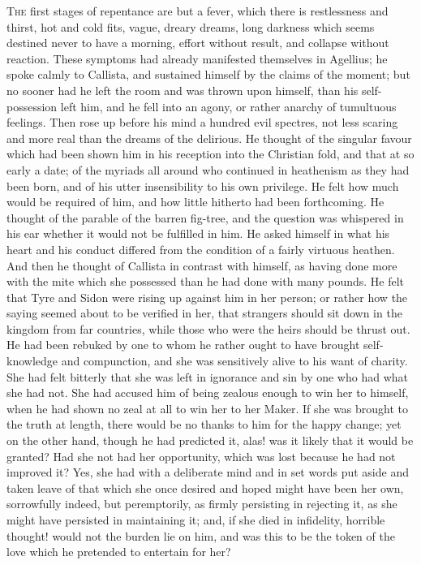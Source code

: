 T\textsc{he} first stages of repentance are but a fever, which there
is restlessness and thirst, hot and cold fits, vague, dreary dreams,
long darkness which seems destined never to have a morning, effort
without result, and collapse without reaction. These symptoms had
already manifested themselves in Agellius; he spoke calmly to Callista,
and sustained himself by the claims of the moment; but no sooner had
he left the room and was thrown upon himself, than his self-possession
left him, and he fell into an agony, or rather anarchy of tumultuous
feelings. Then rose up before his mind a hundred evil spectres, not
less scaring and more real than the dreams of the delirious. He
thought of the singular favour which had been shown him in his
reception into the Christian fold, and that at so early a date; of the
myriads all around who continued in heathenism as they had been born,
and of his utter insensibility to his own privilege. He felt how much
would be required of him, and how little hitherto had been
forthcoming. He thought of the parable of the barren fig-tree, and the
question was whispered in his ear whether it would not be
fulfilled in him. He asked himself in what his heart and his conduct
differed from the condition of a fairly virtuous heathen. And then he
thought of Callista in contrast with himself, as having done more with
the mite which she possessed than he had done with many pounds. He
felt that Tyre and Sidon were rising up against him in her person; or
rather how the saying seemed about to be verified in her, that
strangers should sit down in the kingdom from far countries, while
those who were the heirs should be thrust out. He had been rebuked by
one to whom he rather ought to have brought self-knowledge and
compunction, and she was sensitively alive to his want of charity. She
had felt bitterly that she was left in ignorance and sin by one who
had what she had not. She had accused him of being zealous enough to
win her to himself, when he had shown no zeal at all to win her to her
Maker. If she was brought to the truth at length, there would be no
thanks to him for the happy change; yet on the other hand, though he
had predicted it, alas! was it likely that it would be granted? Had
she not had her opportunity, which was lost because he had not
improved it? Yes, she had with a deliberate mind and in set words put
aside and taken leave of that which she once desired and hoped might
have been her own, sorrowfully indeed, but peremptorily, as firmly
persisting in rejecting it, as she might have persisted in maintaining
it; and, if she died in infidelity, horrible thought! would not the
burden lie on him, and was this to be the token of the love
which he pretended to entertain for her?

